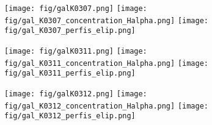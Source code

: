 \begin{figure}[!ht]
\begin{center}
\setcaptionmargin{1cm}
\texttt{[image: fig/galK0307.png]}
\texttt{[image: fig/gal\_K0307\_concentration\_Halpha.png]}
\texttt{[image: fig/gal\_K0307\_perfis\_elip.png]}
\end{center}
\end{figure}


\begin{figure}[!ht]
\begin{center}
\setcaptionmargin{1cm}
\texttt{[image: fig/galK0311.png]}
\texttt{[image: fig/gal\_K0311\_concentration\_Halpha.png]}
\texttt{[image: fig/gal\_K0311\_perfis\_elip.png]}
\end{center}
\end{figure}


\begin{figure}[!ht]
\begin{center}
\setcaptionmargin{1cm}
\texttt{[image: fig/galK0312.png]}
\texttt{[image: fig/gal\_K0312\_concentration\_Halpha.png]}
\texttt{[image: fig/gal\_K0312\_perfis\_elip.png]}
\end{center}
\end{figure}
